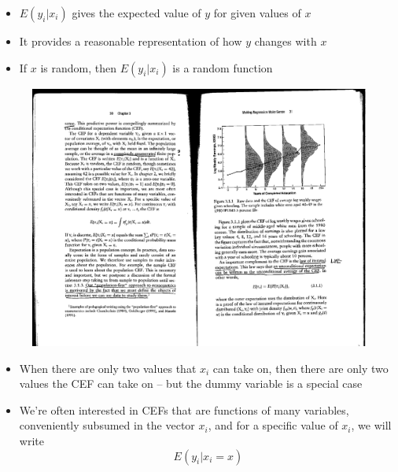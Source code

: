 \documentclass[notes=show]{beamer}
\begin{document}
\begin{frame}[plain]
	\begin{itemize}
	
	\item $E(y_i | x_i )$ gives the expected value of $y$ for given values of $x$
	\item It provides a reasonable representation of how $y$ changes with $x$
	\item If $x$ is random, then $E(y_i | x_i)$ is a random function
	
	\end{itemize}
	
	\begin{figure}[h]
	\includegraphics[scale=0.75]{./lecture_includes/mhe_311.pdf}
	\end{figure}
	
	
\end{frame}


\begin{frame}[plain]

	\begin{itemize}
 	\item When there are only two values that $x_i$ can take on, then there are only two values the CEF can take on -- but the dummy variable is a special case
	\item We're often interested in CEFs that are functions of many variables, conveniently subsumed in the vector $x_i$, and for a specific value of $x_i$, we will write$$E(y_i|x_i=x)$$
	\end{itemize}
\end{frame}
\end{document}

